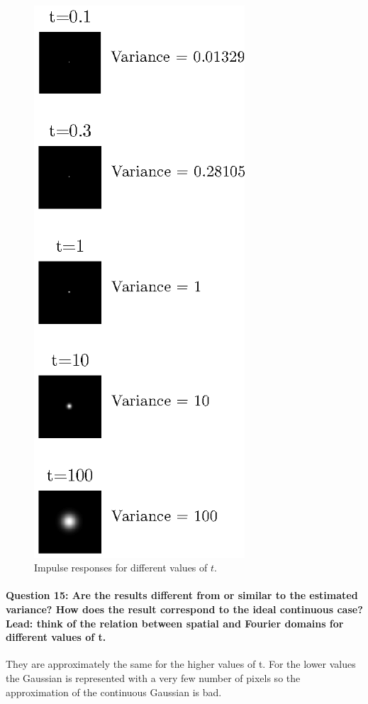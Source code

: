 \documentclass[12pt]{article}
\begin{document}
\begin{figure}[htbp]
 \centering
 \includegraphics[width=0.7\textwidth]{q14}
 \caption{Impulse responses for different values of \(t\).}
 \label{fig:q14}
\end{figure}

\paragraph{Question 15: Are the results different from or similar to the estimated variance? How does the result correspond to the ideal continuous case? Lead: think of the relation between spatial and Fourier domains for different values of t.}
They are approximately the same for the higher values of t. For the lower values the Gaussian is represented with a very few number of pixels so the approximation of the continuous Gaussian is bad.
\end{document}
